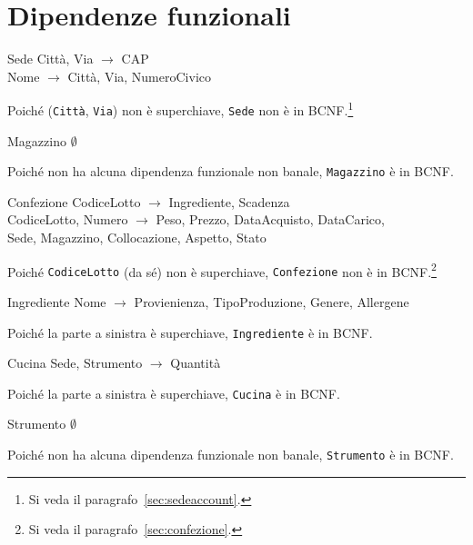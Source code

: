 \section{Dipendenze funzionali}\label{sec:functionaldependencies}
\begin{samepage}
\begin{funcdep}{Sede}
    Città, Via $\to$ CAP\\
    Nome $\to$ Città, Via, NumeroCivico
\end{funcdep}
Poiché ({\tt Città}, {\tt Via}) non è superchiave, {\tt Sede} non
è in BCNF.\footnote{Si veda il paragrafo~\vref{sec:sedeaccount}.}
\end{samepage}

\begin{samepage}
\begin{funcdep}{Magazzino}
    $\emptyset$
\end{funcdep}
Poiché non ha alcuna dipendenza funzionale non banale, {\tt Magazzino} è in BCNF.
\end{samepage}

\begin{samepage}
\begin{funcdep}{Confezione}
    CodiceLotto $\to$ Ingrediente, Scadenza\\
    CodiceLotto, Numero $\to$ Peso, Prezzo, DataAcquisto, DataCarico,\\
        \indent\indent\indent\indent\indent  Sede, Magazzino, Collocazione, Aspetto, Stato
\end{funcdep}
Poiché {\tt CodiceLotto} (da sé) non è superchiave, {\tt Confezione} non è in BCNF.\footnote{Si veda il paragrafo~\vref{sec:confezione}.}
\end{samepage}

\begin{samepage}
\begin{funcdep}{Ingrediente}
    Nome $\to$ Provienienza, TipoProduzione, Genere, Allergene
\end{funcdep}
Poiché la parte a sinistra è superchiave, {\tt Ingrediente} è in BCNF.
\end{samepage}

\begin{samepage}
\begin{funcdep}{Cucina}
    Sede, Strumento $\to$ Quantità
\end{funcdep}
Poiché la parte a sinistra è superchiave, {\tt Cucina} è in BCNF.
\end{samepage}

\begin{samepage}
\begin{funcdep}{Strumento}
    $\emptyset$
\end{funcdep}
Poiché non ha alcuna dipendenza funzionale non banale, {\tt Strumento} è in BCNF.
\end{samepage}

